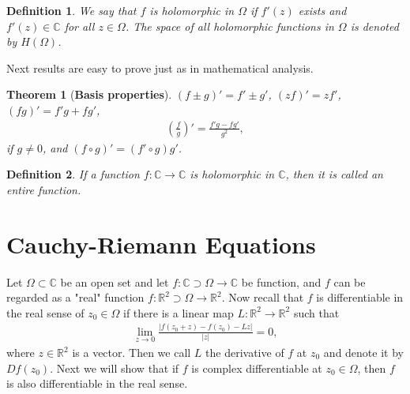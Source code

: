 \documentclass[11pt]{book}
\newtheorem{definition}{Definition}[chapter]
\newtheorem{theorem}{Theorem}[chapter]
\theoremstyle{definition}
\numberwithin{equation}{chapter}
\begin{document}
\medskip

\begin{definition}
We say that $f$ is holomorphic in $\Omega$ if $f'(z)$ exists and $f'(z) \in \mathbb{C}$ for all $z \in \Omega$. The space of all holomorphic functions in $\Omega$ is denoted by $H(\Omega)$.
\end{definition}

\medskip

Next results are easy to prove just as in mathematical analysis. 

\medskip

\begin{theorem}[{\bf Basis properties}]
$(f \pm g)' = f' \pm g'$, $(zf)' = z f'$, $(fg)' = f'g + fg'$, 
\begin{align*}
    \left(\frac{f}{g}\right)' = \frac{f'g - fg'}{g^2},
\end{align*}
if $g \neq 0$, and $(f \circ g)' = (f' \circ g)g'$.
\end{theorem}

\medskip

\begin{definition}\label{def_75}
If a function $f: \mathbb{C} \to \mathbb{C}$ is holomorphic in $\mathbb{C}$, then it is called an entire function.
\end{definition}

\medskip


\section{Cauchy-Riemann Equations}

Let $\Omega \subset \mathbb{C}$ be an open set and let $f: \mathbb{C} \supset \Omega \to \mathbb{C}$ be function, and $f$ can be regarded as a "real" function $f: \mathbb{R}^2 \supset \Omega \to \mathbb{R}^2$. Now recall that $f$ is differentiable in the real sense of $z_0 \in \Omega$ if there is a linear map $L: \mathbb{R}^2 \to \mathbb{R}^2$ such that
\begin{align*}
    \lim_{z\to 0} \frac{\left|f(z_0 + z) - f(z_0) - Lz\right|}{\left|z\right|} = 0,
\end{align*}
where $z \in \mathbb{R}^2$ is a vector. Then we call $L$ the derivative of $f$ at $z_0$ and denote it by $Df(z_0)$. Next we will show that if $f$ is complex differentiable at $z_0 \in \Omega$, then $f$ is also  differentiable in the real sense.
\end{document}
